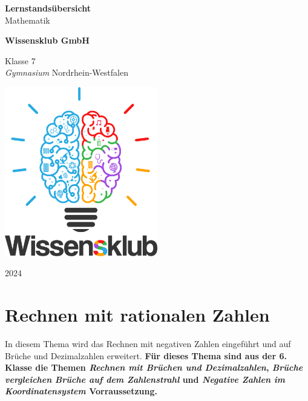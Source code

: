 \documentclass{article}
\begin{document}
\begin{titlepage}
    \begin{center}
        \vspace*{1cm}
            
        \Huge
        \textbf{Lernstandsübersicht}\\            
        \vspace{0.5cm}
        \LARGE
        Mathematik
            
        \vspace{1.5cm}
            
        \textbf{Wissensklub GmbH}
            
        \vfill
            
        Klasse 7\\
        \textit{Gymnasium} Nordrhein-Westfalen
            
        \vspace{0.8cm}
            
        \includegraphics[width=0.5\textwidth]{Wissensklub-Logo.png}
            
        \Large
        2024          
    \end{center}
\end{titlepage}

\section{Rechnen mit rationalen Zahlen}
In diesem Thema wird das Rechnen mit negativen Zahlen eingeführt und auf Brüche und Dezimalzahlen erweitert.
\textbf{Für dieses Thema sind aus der 6. Klasse die Themen \textit{Rechnen mit Brüchen und Dezimalzahlen}, \textit{Brüche vergleichen} \textit{Brüche auf dem Zahlenstrahl} und \textit{Negative Zahlen im Koordinatensystem} Vorraussetzung.}
\end{document}
